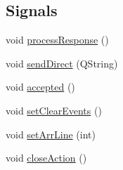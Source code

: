 \subsection*{Signals}
\begin{DoxyCompactItemize}
\item 
void \hyperlink{classFglForm_a797f5a3e960a73a6fff9a1bb74059956}{processResponse} ()
\item 
void \hyperlink{classFglForm_ab8e58a4d027770ba170972d247b617dd}{sendDirect} (QString)
\item 
void \hyperlink{classFglForm_a1e972cdb1514dcb3c6613d123beb8f6a}{accepted} ()
\item 
void \hyperlink{classFglForm_a9c7de4f0bd6f44e3103df2e81a504974}{setClearEvents} ()
\item 
void \hyperlink{classFglForm_a7bef8f5a9e151e3b09d9de652b78ec92}{setArrLine} (int)
\item 
void \hyperlink{classFglForm_a6084470ee7bb46645d64a82503c60fba}{closeAction} ()
\end{DoxyCompactItemize}
